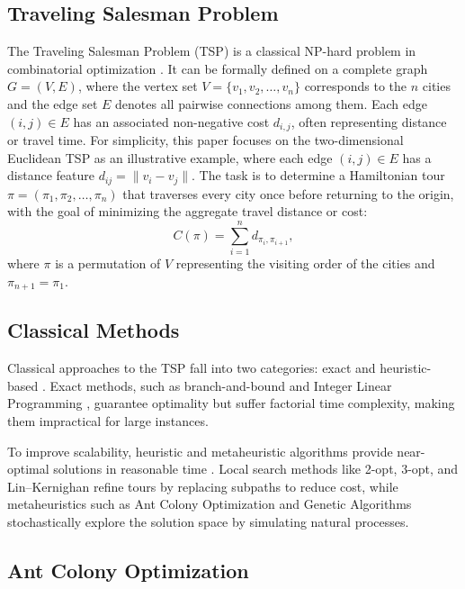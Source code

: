 \documentclass[a4paper,conference]{IEEEtran}
\begin{document}
\subsection{Traveling Salesman Problem}
The Traveling Salesman Problem (TSP) is a classical NP-hard problem in combinatorial optimization \cite{Applications}. It can be formally defined on a complete graph $G=(V,E)$, where the vertex set $V=\{v_1,v_2,\dots,v_n\}$ corresponds to the $n$ cities and the edge set $E$ denotes all pairwise connections among them. Each edge $(i,j)\in E$ has an associated non-negative cost $d_{i,j}$, often representing distance or travel time. For simplicity, this paper focuses on the two-dimensional Euclidean TSP as an illustrative example, where each edge $(i,j)\in E$ has a distance feature
$d_{ij} = \|v_i - v_j\|$.
The task is to determine a Hamiltonian tour $\pi = (\pi_1, \pi_2, \dots, \pi_n)$ that traverses every city once before returning to the origin, with the goal of minimizing the aggregate travel distance or cost:
\begin{equation}
C(\pi) = \sum_{i=1}^n d_{\pi_i,\pi_{i+1}},
\end{equation}
where $\pi$ is a permutation of $V$ representing the visiting order of the cities and $\pi_{n+1}=\pi_1$.

\subsection{Classical Methods}
Classical approaches to the TSP fall into two categories: exact and heuristic-based \cite{TSP2}. Exact methods, such as branch-and-bound \cite{branch} and Integer Linear Programming \cite{LP}, guarantee optimality but suffer factorial time complexity, making them impractical for large instances.

To improve scalability, heuristic and metaheuristic algorithms provide near-optimal solutions in reasonable time \cite{MetaHeuristic}. Local search methods like 2-opt, 3-opt, and Lin–Kernighan \cite{twoopt,LKH} refine tours by replacing subpaths to reduce cost, while metaheuristics such as Ant Colony Optimization \cite{ACO} and Genetic Algorithms \cite{GA} stochastically explore the solution space by simulating natural processes.

\subsection{Ant Colony Optimization}
\end{document}
